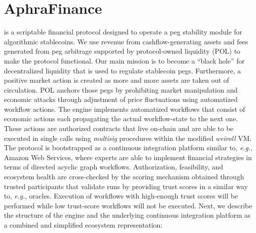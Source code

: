 \section{AphraFinance}
\label{sec:aphrafinance}
\aphra is a scriptable financial protocol designed to operate a peg stability module for algorithmic stablecoins.
We use revenue from cashflow-generating assets and fees generated from peg arbitrage supported by protocol-owned liquidity (POL) to make the protocol functional.\cite{aphra-finance}
Our main mission is to become a ``black hole'' for decentralized liquidity that is used to regulate stablecoin pegs.
Furthermore, a positive market action is created as more and more assets are taken out of circulation. 
POL anchors those pegs by prohibiting market manipulation and economic attacks through adjustment of price fluctuations using automatized workflow actions.
The \aphra engine implements automatized workflows that consist of economic actions each propagating the actual workflow-state to the next one.
These actions are authorized contracts that live on-chain and are able to be executed in single calls using \textit{multisig} procedures within the modified \textit{weiroll} VM.\cite{weirollvm}
The protocol is bootstrapped as a continuous integration platform similar to, \textit{e.g.}, Amazon Web Services, where experts are able to implement financial strategies in terms of directed acyclic graph\cite{thulasiraman2011} workflows.
Authorization, feasibility, and ecosystem health are cross-checked by the \aphra scoring mechanism obtained through trusted participants that validate runs by providing trust scores in a similar way to, \textit{e.g.}, oracles.
Execution of workflows with high-enough trust scores will be performed while low trust-score workflows will not be executed.
Next, we describe the structure of the \aphra engine and the underlying continuous integration platform as a combined and simplified ecosystem representation:

